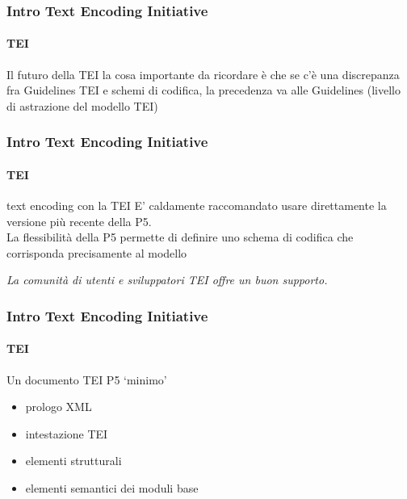 \begin{frame}
	\frametitle{Intro Text Encoding Initiative}
	\framesubtitle{TEI}
	\addtocounter{nframe}{1}

	\begin{block}{Il futuro della TEI}
		la cosa importante da ricordare è che se c’è una discrepanza fra Guidelines TEI e schemi di codifica, la precedenza va alle Guidelines (livello di astrazione del modello TEI)
	\end{block}

\end{frame}


\begin{frame}
	\frametitle{Intro Text Encoding Initiative}
	\framesubtitle{TEI}
	\addtocounter{nframe}{1}

	\begin{block}{text encoding con la TEI}
		E' caldamente raccomandato usare direttamente la
		versione più recente della P5.\\
		La flessibilità della P5 permette di definire uno schema di
		codifica che corrisponda precisamente al modello
    \end{block}
    
    \textit{La comunità di utenti e sviluppatori TEI offre un buon supporto.}

\end{frame}



\begin{frame}
	\frametitle{Intro Text Encoding Initiative}
	\framesubtitle{TEI}
	\addtocounter{nframe}{1}

	\begin{block}{Un documento TEI P5 ‘minimo’}
        \begin{itemize}
            \item prologo XML
            \item intestazione TEI
            \item elementi strutturali
            \item elementi semantici dei moduli base
        \end{itemize}
    \end{block}
    
\end{frame}

